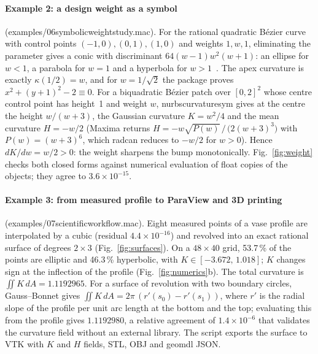 \documentclass[preprint,12pt]{elsarticle}
\newcommand{\code}[1]{{\ttfamily\def\_{\textunderscore\allowbreak}#1}}
\begin{document}
\paragraph{Example 2: a design weight as a symbol} (\code{examples/06\_symbolic\_weight\_study.mac}). For the rational quadratic Bézier curve with control points $(-1,0),(0,1),(1,0)$ and weights $1,w,1$, eliminating the parameter gives a conic with discriminant $64(w-1)w^2(w+1)$: an ellipse for $w<1$, a parabola for $w=1$ and a hyperbola for $w>1$~\cite[Ch.~7]{PieglTiller1997}. The apex curvature is exactly $\kappa(1/2)=w$, and for $w=1/\sqrt2$ the package proves $x^2+(y+1)^2-2\equiv0$. For a biquadratic Bézier patch over $[0,2]^2$ whose centre control point has height~1 and weight $w$, \code{nurbs\_curvature\_sym} gives at the centre the height $w/(w+3)$, the Gaussian curvature $K=w^2/4$ and the mean curvature $H=-w/2$ (Maxima returns $H=-w\sqrt{P(w)}\,/\,\bigl(2(w+3)^3\bigr)$ with $P(w)=(w+3)^6$, which \code{radcan} reduces to $-w/2$ for $w>0$). Hence $dK/dw=w/2>0$: the weight sharpens the bump monotonically. Fig.~\ref{fig:weight} checks both closed forms against numerical evaluation of float copies of the objects; they agree to $3.6\times10^{-15}$.

\paragraph{Example 3: from measured profile to ParaView and 3D printing} (\code{examples/07\_scientific\_workflow.mac}). Eight measured points of a vase profile are interpolated by a cubic (residual $4.4\times10^{-16}$) and revolved into an exact rational surface of degrees $2\times3$ (Fig.~\ref{fig:surfaces}). On a $48\times40$ grid, 53.7\,\% of the points are elliptic and 46.3\,\% hyperbolic, with $K\in[-3.672,\,1.018]$; $K$ changes sign at the inflection of the profile (Fig.~\ref{fig:numerics}b). The total curvature is $\iint K\,dA=1.1192965$. For a surface of revolution with two boundary circles, Gauss--Bonnet gives $\iint K\,dA=2\pi\,(r'(s_0)-r'(s_1))$, where $r'$ is the radial slope of the profile per unit arc length at the bottom and the top; evaluating this from the profile gives $1.1192980$, a relative agreement of $1.4\times10^{-6}$ that validates the curvature field without an external library. The script exports the surface to VTK with $K$ and $H$ fields, STL, OBJ and geomdl JSON.
\end{document}
